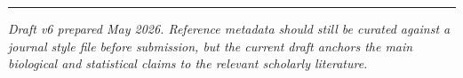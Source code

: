 \documentclass[11pt]{article}
\begin{document}
\vspace{1em}
\begin{center}
\rule{0.4\textwidth}{0.4pt}
\end{center}
\vspace{0.3em}
\noindent\textit{Draft v6 prepared May 2026. Reference metadata should still be curated against a journal style file before submission, but the current draft anchors the main biological and statistical claims to the relevant scholarly literature.}
\end{document}
